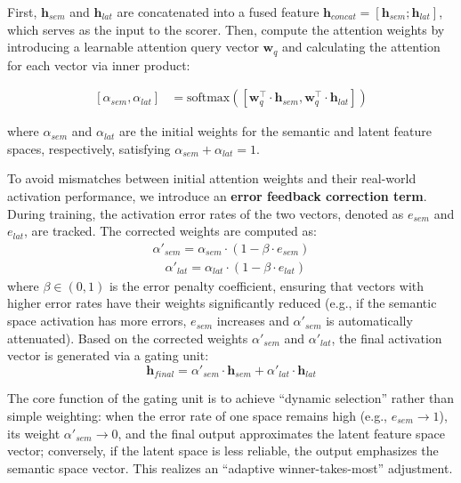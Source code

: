 \documentclass[11pt]{article}
\begin{document}
First,  $\mathbf{h}_{sem}$ and $\mathbf{h}_{lat}$ are concatenated into a fused feature $\mathbf{h}_{concat} = [\mathbf{h}_{sem}; \mathbf{h}_{lat}]$, which serves as the input to the scorer. Then, compute the attention weights by introducing a learnable attention query vector $\mathbf{w}_q$ and calculating the attention for each vector via inner product:

\begin{equation}
\begin{split}
    \left[ \alpha_{sem}, \alpha_{lat} \right] &= \text{softmax}\left(\left[ \mathbf{w}_q^\top \cdot \mathbf{h}_{sem}, \mathbf{w}_q^\top \cdot \mathbf{h}_{lat} \right]\right)
\end{split}
\label{eq:joint-attention}
\end{equation}

where $\alpha_{sem}$ and $\alpha_{lat}$ are the initial weights for the semantic and latent feature spaces, respectively, satisfying $\alpha_{sem} + \alpha_{lat} = 1$.

To avoid mismatches between initial attention weights and their real-world activation performance, we introduce an \textbf{error feedback correction term}. During training, the activation error rates of the two vectors, denoted as $e_{sem}$ and $e_{lat}$, are tracked. The corrected weights are computed as:
\begin{equation}
\begin{split}
    \alpha'_{sem} = \alpha_{sem} \cdot (1 - \beta \cdot e_{sem}) \\
    \quad \alpha'_{lat} = \alpha_{lat} \cdot (1 - \beta \cdot e_{lat})
    \label{eq:error-correction}
\end{split}
\end{equation}
where $\beta \in (0,1)$ is the error penalty coefficient, ensuring that vectors with higher error rates have their weights significantly reduced (e.g., if the semantic space activation has more errors, $e_{sem}$ increases and $\alpha'_{sem}$ is automatically attenuated). Based on the corrected weights $\alpha'_{sem}$ and $\alpha'_{lat}$, the final activation vector is generated via a gating unit:
\begin{equation}
    \mathbf{h}_{final} = \alpha'_{sem} \cdot \mathbf{h}_{sem} + \alpha'_{lat} \cdot \mathbf{h}_{lat}
    \label{eq:gated-fusion}
\end{equation}

The core function of the gating unit is to achieve ``dynamic selection'' rather than simple weighting: when the error rate of one space remains high (e.g., $e_{sem} \to 1$), its weight $\alpha'_{sem} \to 0$, and the final output approximates the latent feature space vector; conversely, if the latent space is less reliable, the output emphasizes the semantic space vector. This realizes an ``adaptive winner-takes-most'' adjustment.
\end{document}
